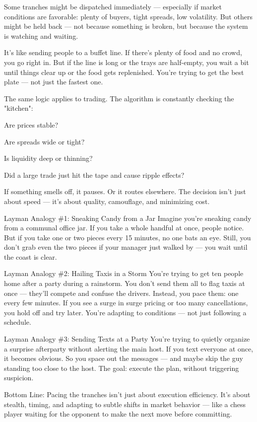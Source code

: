 Some tranches might be dispatched immediately — especially if market conditions are favorable: plenty of buyers, tight spreads, low volatility. But others might be held back — not because something is broken, but because the system is watching and waiting.

It’s like sending people to a buffet line. If there’s plenty of food and no crowd, you go right in. But if the line is long or the trays are half-empty, you wait a bit until things clear up or the food gets replenished. You’re trying to get the best plate — not just the fastest one.

The same logic applies to trading. The algorithm is constantly checking the "kitchen":

Are prices stable?

Are spreads wide or tight?

Is liquidity deep or thinning?

Did a large trade just hit the tape and cause ripple effects?

If something smells off, it pauses. Or it routes elsewhere. The decision isn’t just about speed — it’s about quality, camouflage, and minimizing cost.

Layman Analogy \#1: Sneaking Candy from a Jar
Imagine you're sneaking candy from a communal office jar.
If you take a whole handful at once, people notice. But if you take one or two pieces every 15 minutes, no one bats an eye. Still, you don’t grab even the two pieces if your manager just walked by — you wait until the coast is clear.

Layman Analogy \#2: Hailing Taxis in a Storm
You're trying to get ten people home after a party during a rainstorm.
You don’t send them all to flag taxis at once — they’ll compete and confuse the drivers.
Instead, you pace them: one every few minutes.
If you see a surge in surge pricing or too many cancellations, you hold off and try later. You’re adapting to conditions — not just following a schedule.

Layman Analogy \#3: Sending Texts at a Party
You’re trying to quietly organize a surprise afterparty without alerting the main host.
If you text everyone at once, it becomes obvious. So you space out the messages — and maybe skip the guy standing too close to the host. The goal: execute the plan, without triggering suspicion.

Bottom Line:
Pacing the tranches isn’t just about execution efficiency.
It’s about stealth, timing, and adapting to subtle shifts in market behavior — like a chess player waiting for the opponent to make the next move before committing.









